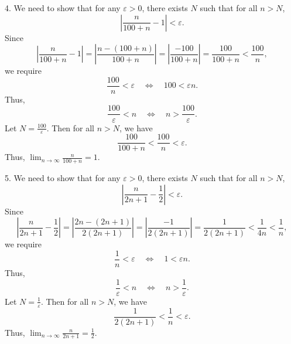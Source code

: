 \begin{solution}
4. We need to show that for any \(\varepsilon > 0\), there exists \(N\) such that for all \(n > N\),
\[
\left| \frac{n}{100+n} - 1 \right| < \varepsilon.
\]
Since
\[
\left| \frac{n}{100+n} - 1 \right| = \left| \frac{n - (100+n)}{100+n} \right| = \left| \frac{-100}{100+n} \right| = \frac{100}{100+n} < \frac{100}{n},
\]
we require
\[
\frac{100}{n} < \varepsilon \quad \Leftrightarrow \quad 100 < \varepsilon n.
\]
Thus,
\[
\frac{100}{\varepsilon} < n \quad \Leftrightarrow \quad n > \frac{100}{\varepsilon}.
\]
Let \(N = \frac{100}{\varepsilon}\). Then for all \(n > N\), we have
\[
\frac{100}{100+n}< \frac{100}{n} < \varepsilon.
\]
Thus, \(\lim_{n \to \infty} \frac{n}{100+n} = 1\).

5. We need to show that for any \(\varepsilon > 0\), there exists \(N\) such that for all \(n > N\),
\[
\left| \frac{n}{2n+1} - \frac{1}{2} \right| < \varepsilon.
\]
Since
\[
\left| \frac{n}{2n+1} - \frac{1}{2} \right| = \left| \frac{2n - (2n+1)}{2(2n+1)} \right| = \left| \frac{-1}{2(2n+1)} \right| = \frac{1}{2(2n+1)} < \frac{1}{4n} < \frac{1}{n},
\]
we require
\[
\frac{1}{n} < \varepsilon \quad \Leftrightarrow \quad 1 < \varepsilon n.
\]
Thus,
\[
\frac{1}{\varepsilon} < n \quad \Leftrightarrow \quad n > \frac{1}{\varepsilon}.
\]
Let \(N = \frac{1}{\varepsilon} \). Then for all \(n > N\), we have
\[
\frac{1}{2(2n+1)}< \frac{1}{n}< \varepsilon.
\]
Thus, \(\lim_{n \to \infty} \frac{n}{2n+1} = \frac{1}{2}\).

\end{solution}

